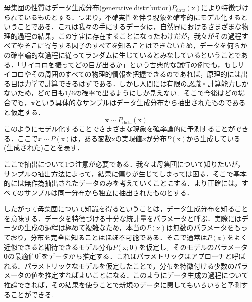 \documentclass[a4paper,11pt]{jsreport}
\begin{document}
母集団の性質はデータ生成分布(generative distribution)$P_{\text{data}}(\mathrm{x})$により特徴づけられているものとする．つまり，不確実性を伴う現象を確率的にモデル化するということである．これは我々の手にするデータは，自然界におけるさまざまな物理的過程の結果，この宇宙に存在することになったわけだが，我々がその過程すべてやそこに寄与する因子のすべてを知ることはできないため，データを何らかの確率論的な過程に従ってランダムに生じているとみなしているということである．「サイコロを振ってどの目が出るか」という古典的な試行の例でも，もしサイコロやその周囲のすべての物理的情報を把握できるのであれば，原理的には出る目は力学で計算できるはずである．しかし人間には有限の認識・計算能力しかないため，どの目も1/6の確率で出るようにしか見えない．そこで今後はどの場合でも，$\bm{x}$という具体的なサンプルはデータ生成分布から抽出されたものであると仮定する．
\begin{equation}
  \bm{x} \sim P_{\text{data}}(\mathrm{x})
\end{equation}
このようにモデル化することでさまざまな現象を確率論的に予測することができる．ここで$x \sim P(\mathrm{x})$は，ある変数$\mathrm{x}$の実現値$x$が分布$P(\mathrm{x})$から生成している(生成された)ことを表す．\par
ここで抽出について1つ注意が必要である．我々は母集団について知りたいが，サンプルの抽出方法によって，結果に偏りが生じてしまっては困る．そこで基本的には無作為抽出されたデータのみを考えていくことにする．より正確には，すべてのサンプルは同一分布から独立に抽出されたものとする．\par
したがって母集団について知識を得るということは，データ生成分布を知ることを意味する．データを特徴づける十分な統計量をパラメータと呼ぶ．実際にはデータの生成の過程は極めて複雑なため，本当の$P(\mathrm{x})$は無数のパラメータをもっており，分布を完全に知ることはほぼ不可能である．そこで通常は$P(\mathrm{x})$をよく近似できると期待できるモデル分布$P(\mathrm{x};\bm{\theta})$を仮定し，そのモデルのパラメータ$\bm{\theta}$の最適値$\bm{\theta}^*$をデータから推定する．これはパラメトリックはアプローチと呼ばれる．パラメトリックなモデルを仮定したことで，分布を特徴付ける少数のパラメータの値を推定すればよいことになる．このようにデータ生成の過程について推論できれば，その結果を使うことで新規のデータに関してもいろいろと予測することができる.
\end{document}
